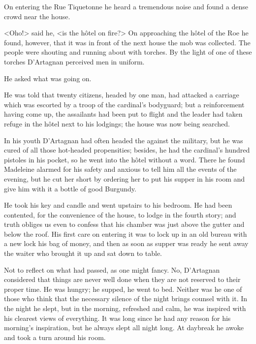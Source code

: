 On entering the Rue Tiquetonne he heard a tremendous noise and found a dense crowd near the house.

<Oho!> said he, <is the hôtel on fire?> On approaching the hôtel of the Roe he found, however, that it was in front of the next house the mob was collected. The people were shouting and running about with torches. By the light of one of these torches D'Artagnan perceived men in uniform.

He asked what was going on.

He was told that twenty citizens, headed by one man, had attacked a carriage which was escorted by a troop of the cardinal's bodyguard; but a reinforcement having come up, the assailants had been put to flight and the leader had taken refuge in the hôtel next to his lodgings; the house was now being searched.

In his youth D'Artagnan had often headed the  against the military, but he was cured of all those hot-headed propensities; besides, he had the cardinal's hundred pistoles in his pocket, so he went into the hôtel without a word. There he found Madeleine alarmed for his safety and anxious to tell him all the events of the evening, but he cut her short by ordering her to put his supper in his room and give him with it a bottle of good Burgundy.

He took his key and candle and went upstairs to his bedroom. He had been contented, for the convenience of the house, to lodge in the fourth story; and truth obliges us even to confess that his chamber was just above the gutter and below the roof. His first care on entering it was to lock up in an old bureau with a new lock his bag of money, and then as soon as supper was ready he sent away the waiter who brought it up and sat down to table.

Not to reflect on what had passed, as one might fancy. No, D'Artagnan considered that things are never well done when they are not reserved to their proper time. He was hungry; he supped, he went to bed. Neither was he one of those who think that the necessary silence of the night brings counsel with it. In the night he slept, but in the morning, refreshed and calm, he was inspired with his clearest views of everything. It was long since he had any reason for his morning's inspiration, but he always slept all night long. At daybreak he awoke and took a turn around his room.


